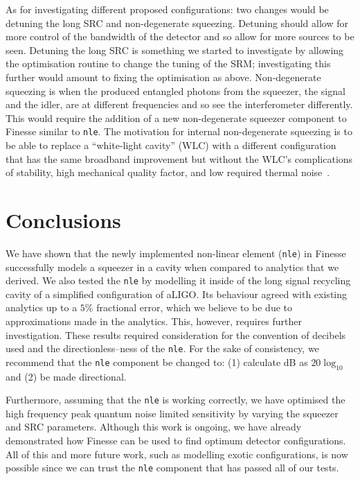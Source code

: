 \documentclass[aps,pra,superscriptaddress,reprint,nofootinbib]{revtex4-1}
\newcommand{\code}[1]{\texttt{#1}}
\begin{document}
As for investigating different proposed configurations: two changes would be detuning the long SRC and non-degenerate squeezing. Detuning should allow for more control of the bandwidth of the detector and so allow for more sources to be seen.
Detuning the long SRC is something we started to investigate by allowing the optimisation routine to change the tuning of the SRM; investigating this further would amount to fixing the optimisation as above.
Non-degenerate squeezing is when the produced entangled photons from the squeezer, the signal and the idler, are at different frequencies and so see the interferometer differently. This would require the addition of a new non-degenerate squeezer component to Finesse similar to \code{nle}. The motivation for internal non-degenerate squeezing is to be able to replace a ``white-light cavity'' (WLC) with a different configuration that has the same broadband improvement but without the WLC’s complications of stability, high mechanical quality factor, and low required thermal noise~\cite{white-light-resonators}.




\section{Conclusions}
\label{sec:conclusions}

We have shown that the newly implemented non-linear element (\code{nle}) in Finesse successfully models a squeezer in a cavity when compared to analytics that we derived.
We also tested the \code{nle} by modelling it inside of the long signal recycling cavity of a simplified configuration of aLIGO. Its behaviour agreed with existing analytics up to a $5\%$ fractional error, which we believe to be due to approximations made in the analytics. This, however, requires further investigation. These results required consideration for the convention of decibels used and the directionless--ness of the \code{nle}. For the sake of consistency, we recommend that the \code{nle} component be changed to: (1) calculate dB as $20 \log_{10}$ and (2) be made directional.

Furthermore, assuming that the \code{nle} is working correctly, we have optimised the high frequency peak quantum noise limited sensitivity by varying the squeezer and SRC parameters. Although this work is ongoing, we have already demonstrated how Finesse can be used to find optimum detector configurations. All of this and more future work, such as modelling exotic configurations, is now possible since we can trust the \code{nle} component that has passed all of our tests.
\end{document}
